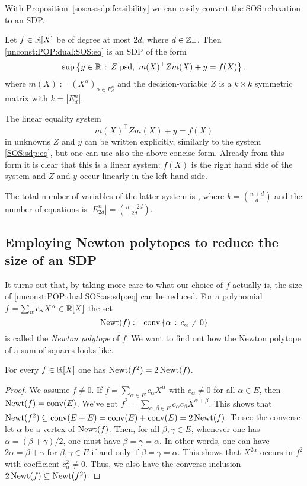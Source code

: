 With Proposition~\ref{sos:as:sdp:feasibility} we can easily convert the SOS-relaxation to an SDP. 

\begin{corollary}
	Let $f \in \mathbb{R}[X]$ be of degree at most $2 d$, where $d \in \mathbb{Z}_+$. Then \eqref{unconst:POP:dual:SOS:eq} is an SDP of the form
	\begin{equation}
		\sup \left\{ y \in \mathbb{R} \,:\, Z \ \text{psd}, \  m(X)^\top Z m(X) + y = f(X) \right\}. \label{unconst:POP:dual:SOS:as:sdp:eq}
	\end{equation}
	where $m(X) := (X^\alpha)_{\alpha \in E^n_d}$ and the decision-variable $Z$ is a $k \times k$ symmetric matrix with $k=|E^n_d|$. 
\end{corollary}

The linear equality system 
\[
	m(X)^\top Z m(X) + y = f(X)
\]
in unknowns $Z$ and $y$ can be written explicitly, similarly to the system \eqref{SOS:sdp:eq}, but one can use also the above concise form. Already from this form it is clear that this is a linear system: $f(X)$ is the right hand side of the system and $Z$ and $y$ occur linearly in the left hand side.

The total number of variables of the latter system is , where $k = \binom{n+d}{d}$ and the number of equations is $|E_{2d}^n| = \binom{n+2d}{2d}$. 

\subsection{Employing Newton polytopes to reduce the size of an SDP} 

It turns out that, by taking more care to what our choice of $f$ actually is, the size of \eqref{unconst:POP:dual:SOS:as:sdp:eq} can be reduced. For a polynomial $f = \sum_\alpha c_\alpha X^\alpha \in \mathbb{R}[X]$ the set 
\[
	\operatorname{Newt}(f) := \operatorname{conv} \left\{  \alpha  \,:\, c_\alpha \ne 0 \right\}
\]
is called the \emph{Newton polytope} of $f$. We want to find out how the Newton polytope of a sum of squares looks like.  

\begin{lemma}
	\label{Newton:of:square}
	For every $f \in \mathbb{R}[X]$ one has $\operatorname{Newt}(f^2) = 2 \operatorname{Newt}(f)$. 
\end{lemma}
\begin{proof}
	We assume $f \ne 0$. If $f = \sum_{\alpha \in E} c_\alpha X^\alpha$ with $c_\alpha \ne 0$ for all $\alpha \in E$, then $\operatorname{Newt}(f) = \operatorname{conv}(E)$. We've got $f^2 = \sum_{\alpha, \beta \in E} c_\alpha c_\beta X^{\alpha + \beta}$. This shows that $\operatorname{Newt}(f^2) \subseteq \operatorname{conv}(E+E) = \operatorname{conv}(E)+\operatorname{conv}(E) = 2 \operatorname{Newt}(f)$. To see the converse let $\alpha$ be a vertex of $\operatorname{Newt}(f)$. Then, for all $\beta,\gamma \in E$, whenever one has $\alpha = (\beta+ \gamma)/2$, one must have $\beta=\gamma=\alpha$. In other words, one can have $2 \alpha = \beta + \gamma$ for $\beta,\gamma \in E$ if and only if $\beta=\gamma=\alpha$. This shows that $X^{2\alpha}$ occurs in $f^2$ with coefficient $c_\alpha^2 \ne 0$. Thus, we also have the converse inclusion $2 \operatorname{Newt}(f) \subseteq \operatorname{Newt}(f^2)$. 
\end{proof}


